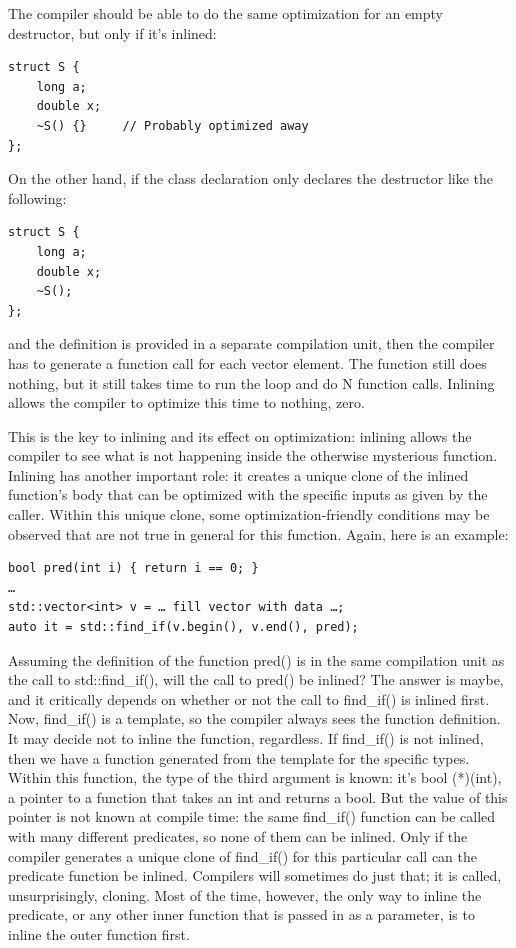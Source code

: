 The compiler should be able to do the same optimization for an empty destructor, but only if it's inlined:

\begin{lstlisting}[style=styleCXX]
struct S {
	long a;
	double x;
	~S() {}     // Probably optimized away
};
\end{lstlisting}

On the other hand, if the class declaration only declares the destructor like the following:

\begin{lstlisting}[style=styleCXX]
struct S {
	long a;
	double x;
	~S();
};
\end{lstlisting}

and the definition is provided in a separate compilation unit, then the compiler has to generate a function call for each vector element. The function still does nothing, but it still takes time to run the loop and do N function calls. Inlining allows the compiler to optimize this time to nothing, zero.

This is the key to inlining and its effect on optimization: inlining allows the compiler to see what is not happening inside the otherwise mysterious function. Inlining has another important role: it creates a unique clone of the inlined function's body that can be optimized with the specific inputs as given by the caller. Within this unique clone, some optimization-friendly conditions may be observed that are not true in general for this function. Again, here is an example:


\begin{lstlisting}[style=styleCXX]
bool pred(int i) { return i == 0; }
… 
std::vector<int> v = … fill vector with data …;
auto it = std::find_if(v.begin(), v.end(), pred);
\end{lstlisting}

Assuming the definition of the function pred() is in the same compilation unit as the call to std::find\_if(), will the call to pred() be inlined? The answer is maybe, and it critically depends on whether or not the call to find\_if() is inlined first. Now, find\_if() is a template, so the compiler always sees the function definition. It may decide not to inline the function, regardless. If find\_if() is not inlined, then we have a function generated from the template for the specific types. Within this function, the type of the third argument is known: it's bool (*)(int), a pointer to a function that takes an int and returns a bool. But the value of this pointer is not known at compile time: the same find\_if() function can be called with many different predicates, so none of them can be inlined. Only if the compiler generates a unique clone of find\_if() for this particular call can the predicate function be inlined. Compilers will sometimes do just that; it is called, unsurprisingly, cloning. Most of the time, however, the only way to inline the predicate, or any other inner function that is passed in as a parameter, is to inline the outer function first. 

